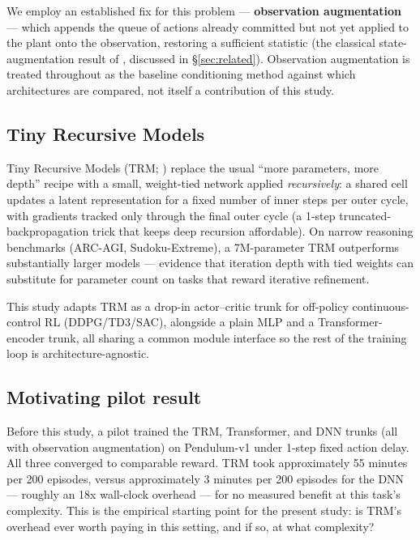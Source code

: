 \documentclass[11pt]{article}
\begin{document}
We employ an established fix for this problem --- \textbf{observation augmentation} --- which appends the queue of actions already committed but not yet applied to the plant onto the observation, restoring a sufficient statistic (the classical state-augmentation result of \citealp{katsikopoulos2003delayed}, discussed in \S\ref{sec:related}). Observation augmentation is treated throughout as the baseline conditioning method against which architectures are compared, not itself a contribution of this study.

\subsection{Tiny Recursive Models}

Tiny Recursive Models (TRM; \citealp{jolicoeurmartineau2025trm}) replace the usual ``more parameters, more depth'' recipe with a small, weight-tied network applied \emph{recursively}: a shared cell updates a latent representation for a fixed number of inner steps per outer cycle, with gradients tracked only through the final outer cycle (a 1-step truncated-backpropagation trick that keeps deep recursion affordable). On narrow reasoning benchmarks (ARC-AGI, Sudoku-Extreme), a 7M-parameter TRM outperforms substantially larger models --- evidence that iteration depth with tied weights can substitute for parameter count on tasks that reward iterative refinement.

This study adapts TRM as a drop-in actor--critic trunk for off-policy continuous-control RL (DDPG/TD3/SAC), alongside a plain MLP and a Transformer-encoder trunk, all sharing a common module interface so the rest of the training loop is architecture-agnostic.

\subsection{Motivating pilot result}

Before this study, a pilot trained the TRM, Transformer, and DNN trunks (all with observation augmentation) on Pendulum-v1 under 1-step fixed action delay. All three converged to comparable reward. TRM took approximately 55 minutes per 200 episodes, versus approximately 3 minutes per 200 episodes for the DNN --- roughly an 18x wall-clock overhead --- for no measured benefit at this task's complexity. This is the empirical starting point for the present study: is TRM's overhead ever worth paying in this setting, and if so, at what complexity?
\end{document}
